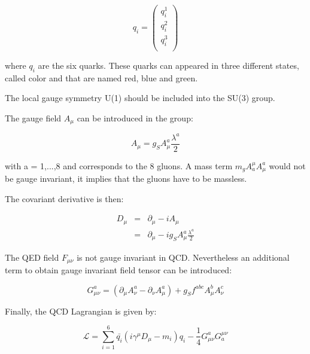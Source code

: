     \begin{equation}
      q_i = 
        \begin{pmatrix}
          q_i^1 \\
          q_i^2 \\
          q_i^3 \\
        \end{pmatrix}
     \end{equation}
    
    where $q_i$ are the six quarks.
    These quarks can appeared in three different states, called color and that are named red, blue and green.

    The local gauge symmetry U(1) should be included into the SU(3) group.
    
    The gauge field $A_{\mu}$ can be introduced in the group:
    
    \begin{equation}
      A_{\mu} = g_S A^a_{\mu}\frac{\lambda^a}{2}
    \end{equation}
     
    with a = 1,...,8 and corresponds to the 8 gluons.
    A mass term  $m_g A^{\mu}_a A^a_{\mu}$ would not be gauge invariant, it implies that the gluons have to be massless.

    The covariant derivative is then:

    \begin{equation}
      \begin{array}{rcl}
        D_{\mu} & = & \partial_{\mu} - i A_{\mu} \\
                & = & \partial_{\mu} - i g_S A^a_{\mu} \frac{\lambda^a}{2}
      \end{array}
    \end{equation}

    The QED field $F_{\mu \nu}$ is not gauge invariant in QCD.
    Nevertheless an additional term to obtain gauge invariant field tensor can be introduced:
    
    \begin{equation}
      G^a_{\mu \nu} = \left( \partial_{\mu} A^a_{\nu} - \partial_{\nu} A^a_{\mu} \right) + g_S f^{abc} A^b_{\mu} A^c_{\nu}
    \end{equation} 

    Finally, the QCD Lagrangian is given by:

    \begin{equation}
      \mathcal{L} = \sum_{i=1}^6  \bar{q_i} \left(i \gamma^{\mu}D_{\mu} -m_i \right)q_i - \frac{1}{4} G_{\mu \nu}^{a} G_{a}^{\mu \nu}
    \end{equation}
    

